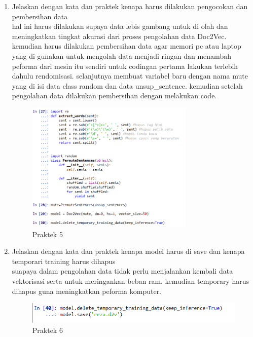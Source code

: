 \begin{enumerate}
\item Jelaskan dengan kata dan praktek kenapa harus dilakukan pengocokan dan pembersihan data
	\hfill\\
hal ini harus dilakukan supaya data lebis gambang untuk di olah dan meningkatkan tingkat akurasi dari proses pengolahan data Doc2Vec. kemudian harus dilakukan pembersihan data agar memori pc atau laptop yang di gunakan untuk mengolah data menjadi ringan dan menambah peforma dari mesin itu sendiri untuk codingan pertama lakukan terlebih dahulu rendomisasi. selanjutnya membuat variabel baru dengan nama mute yang di isi data class random dan data unsup\_sentence. kemudian setelah pengolahan data dilakukan pembersihan dengan melakukan code.	

\begin{figure}[H]
    \includegraphics[width=8cm]{figures/1174084/5/17.png}
    \centering
    \caption{Praktek 5}
\end{figure}

\item Jelaskan dengan kata dan praktek kenapa model harus di save dan kenapa temporari training harus dihapus
	\hfill\\
	suapaya dalam pengolahan data tidak perlu menjalankan kembali data vektorisasi serta untuk meringankan beban ram. kemudian temporary harus dihapus guna meningkatkan peforma komputer.

\begin{figure}[H]
    \includegraphics[width=12cm]{figures/1174084/5/18.png}
    \centering
    \caption{Praktek 6}
\end{figure}


\end{enumerate}
